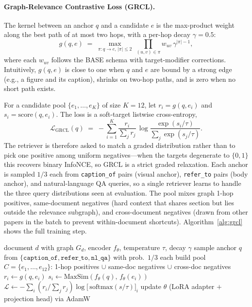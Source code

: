 \documentclass{article}
\begin{document}
\paragraph{Graph-Relevance Contrastive Loss (GRCL).}
The kernel between an anchor $q$ and a candidate $e$ is the max-product
weight along the best path of at most two hops, with a per-hop decay
$\gamma\!=\!0.5$:
\begin{equation}
g(q,e)\;=\;\max_{\pi:q\to e,\,|\pi|\le 2}\ \prod_{(u,v)\in\pi} w_{uv}\,\gamma^{|\pi|-1},
\label{eq:kernel}
\end{equation}
where each $w_{uv}$ follows the BASE schema with target-modifier
corrections.
Intuitively, $g(q,e)$ is close to one when $q$ and $e$ are bound by a
strong edge (e.g., a figure and its caption), shrinks on two-hop paths,
and is zero when no short path exists.

For a candidate pool $\{e_1,\ldots,e_K\}$ of size $K\!=\!12$, let
$r_i\!=\!g(q,e_i)$ and $s_i\!=\!\mathrm{score}(q,e_i)$. The loss is a
soft-target listwise cross-entropy,
\begin{equation}
\mathcal{L}_\text{GRCL}(q)\;=\;-\sum_{i=1}^{K}\frac{r_i}{\sum_j r_j}\,\log\frac{\exp(s_i/\tau)}{\sum_j\exp(s_j/\tau)}.
\label{eq:grcl}
\end{equation}
The retriever is therefore asked to match a graded distribution rather
than to pick one positive among uniform negatives---when the targets
degenerate to $\{0,1\}$ this recovers binary InfoNCE, so GRCL is a
strict graded relaxation.
Each anchor is sampled $1/3$ each from \texttt{caption\_of} pairs
(visual anchor), \texttt{refer\_to} pairs (body anchor), and
natural-language QA queries, so a single retriever learns to handle the
three query distributions seen at evaluation. The pool mixes graph
1-hop positives, same-document negatives (hard context that shares
section but lies outside the relevance subgraph), and cross-document
negatives (drawn from other papers in the batch to prevent
within-document shortcuts). Algorithm~\ref{alg:grcl} shows the full
training step.

\begin{algorithm}[t]
\caption{GRCL training step (one anchor)}
\label{alg:grcl}
\begin{algorithmic}[1]
\Require document $d$ with graph $G_d$, encoder $f_\theta$, temperature $\tau$, decay $\gamma$
\State sample anchor $q$ from $\{\texttt{caption\_of},\texttt{refer\_to},\texttt{nl\_qa}\}$ with prob.\ $1/3$ each
\State build pool $C\!=\!\{e_1,\ldots,e_{12}\}$: 1-hop positives $\cup$ same-doc negatives $\cup$ cross-doc negatives
  \State $r_i \gets g(q, e_i)$  
  \State $s_i \gets \mathrm{MaxSim}(f_\theta(q),\, f_\theta(e_i))$  
\EndFor
\State $\mathcal{L} \gets -\sum_i (r_i / \textstyle\sum_j r_j)\log\!\bigl[\,\mathrm{softmax}(s/\tau)\bigr]_i$  
\State update $\theta$ (LoRA adapter $+$ projection head) via AdamW
\end{algorithmic}
\end{algorithm}
\end{document}
